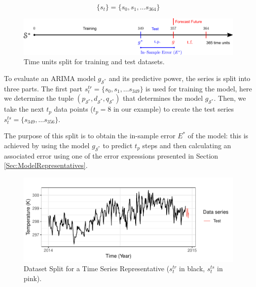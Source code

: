 \begin{equation}
    \{s_{t} \} = \{s_{0}, s_{1}, \ldots s_{364} \}
\end{equation}

\begin{figure}[h!]
	\centering
	\includegraphics[scale=0.38]{../Figures/ModelRegion_ModelTS}
	\caption{Time units split for training and test datasets.}
	\label{Fig:TimeSplit}
\end{figure}

To evaluate an ARIMA model $g_{\mathcal{S}^{*}}$ and its predictive power, the series is split into three parts. The first part $s^{tr}_t = \lbrace s_0, s_1, \ldots s_{349} \rbrace$ is used for training the model, %
here we determine the tuple $(p_{\mathcal{S}^{*}}, d_{\mathcal{S}^{*}}, q_{\mathcal{S}^{*}})$ that determines the model $g_{\mathcal{S}^{*}}$. Then, we take the next $t_p$ data points ($t_p = 8$ in our example) to create the test series $s^{ts}_t = \lbrace s_{349}, \ldots s_{356} \rbrace$.

The purpose of this split is to obtain the in-sample error ${E^*}$ of the model: this is achieved by using the model $g_{\mathcal{S}^{*}}$ to predict $t_p$ steps and then calculating an associated error using one of the error expressions presented in Section \ref{Sec:ModelRepresentatives}.  

\begin{figure}[h!]
	\centering
	\includegraphics[scale=1]{../Figures/medoid_test_training}
	\caption{Dataset Split for a Time Series Representative ($s^{tr}_t$ in black, $s^{ts}_t$ in pink).}
	\label{Fig:Time-SeriesSplit}
\end{figure}

